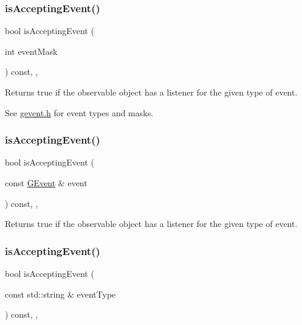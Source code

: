 \subsubsection{\texorpdfstring{is\+Accepting\+Event()}{isAcceptingEvent()}\hspace{0.1cm}{\footnotesize\ttfamily [1/3]}}
{\footnotesize\ttfamily bool is\+Accepting\+Event (\begin{DoxyParamCaption}\item[{int}]{event\+Mask }\end{DoxyParamCaption}) const\hspace{0.3cm}{\ttfamily [protected]}, {\ttfamily [virtual]}, {\ttfamily [inherited]}}



Returns true if the observable object has a listener for the given type of event. 

See \mbox{\hyperlink{gevent_8h_source}{gevent.\+h}} for event types and masks. \mbox{\label{classGObservable_aa31c73145a29dcb92848a92e0cfaea41}} 
\subsubsection{\texorpdfstring{is\+Accepting\+Event()}{isAcceptingEvent()}\hspace{0.1cm}{\footnotesize\ttfamily [2/3]}}
{\footnotesize\ttfamily bool is\+Accepting\+Event (\begin{DoxyParamCaption}\item[{const \mbox{\hyperlink{classGEvent}{G\+Event}} \&}]{event }\end{DoxyParamCaption}) const\hspace{0.3cm}{\ttfamily [protected]}, {\ttfamily [virtual]}, {\ttfamily [inherited]}}



Returns true if the observable object has a listener for the given type of event. 

\mbox{\label{classGObservable_a3b1c689267eda44e65a2213e7de38b23}} 
\subsubsection{\texorpdfstring{is\+Accepting\+Event()}{isAcceptingEvent()}\hspace{0.1cm}{\footnotesize\ttfamily [3/3]}}
{\footnotesize\ttfamily bool is\+Accepting\+Event (\begin{DoxyParamCaption}\item[{const std\+::string \&}]{event\+Type }\end{DoxyParamCaption}) const\hspace{0.3cm}{\ttfamily [protected]}, {\ttfamily [virtual]}, {\ttfamily [inherited]}}




